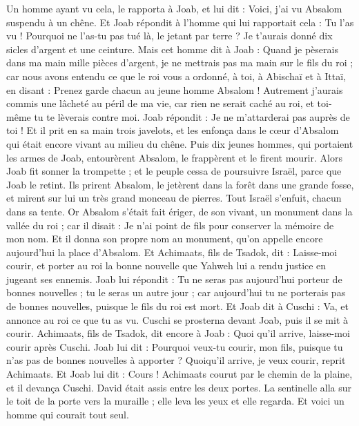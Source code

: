 \begin{multicols}{2}
Un homme ayant vu cela, le rapporta à Joab, et lui dit : Voici, j'ai vu Absalom suspendu à un chêne.
Et Joab répondit à l'homme qui lui rapportait cela : Tu l'as vu ! Pourquoi ne l'as-tu pas tué là, le jetant par terre ? Je t'aurais donné dix sicles d'argent et une ceinture.
Mais cet homme dit à Joab : Quand je pèserais dans ma main mille pièces d'argent, je ne mettrais pas ma main sur le fils du roi ; car nous avons entendu ce que le roi vous a ordonné, à toi, à Abischaï et à Ittaï, en disant : Prenez garde chacun au jeune homme Absalom !
Autrement j’aurais commis une lâcheté au péril de ma vie, car rien ne serait caché au roi, et toi-même tu te lèverais contre moi.
Joab répondit : Je ne m'attarderai pas auprès de toi ! Et il prit en sa main trois javelots, et les enfonça dans le cœur d'Absalom qui était encore vivant au milieu du chêne.
Puis dix jeunes hommes, qui portaient les armes de Joab, entourèrent Absalom, le frappèrent et le firent mourir.
Alors Joab fit sonner la trompette ; et le peuple cessa de poursuivre Israël, parce que Joab le retint.
Ils prirent Absalom, le jetèrent dans la forêt dans une grande fosse, et mirent sur lui un très grand monceau de pierres. Tout Israël s'enfuit, chacun dans sa tente.
Or Absalom s'était fait ériger, de son vivant, un monument dans la vallée du roi ; car il disait : Je n'ai point de fils pour conserver la mémoire de mon nom. Et il donna son propre nom au monument, qu'on appelle encore aujourd'hui la place d'Absalom.
Et Achimaats, fils de Tsadok, dit : Laisse-moi courir, et porter au roi la bonne nouvelle que Yahweh lui a rendu justice en jugeant ses ennemis.
Joab lui répondit : Tu ne seras pas aujourd'hui porteur de bonnes nouvelles ; tu le seras un autre jour ; car aujourd'hui tu ne porterais pas de bonnes nouvelles, puisque le fils du roi est mort.
Et Joab dit à Cuschi : Va, et annonce au roi ce que tu as vu. Cuschi se prosterna devant Joab, puis il se mit à courir.
Achimaats, fils de Tsadok, dit encore à Joab : Quoi qu'il arrive, laisse-moi courir après Cuschi. Joab lui dit : Pourquoi veux-tu courir, mon fils, puisque tu n'as pas de bonnes nouvelles à apporter ?
Quoiqu'il arrive, je veux courir, reprit Achimaats. Et Joab lui dit : Cours ! Achimaats courut par le chemin de la plaine, et il devança Cuschi.
David était assis entre les deux portes. La sentinelle alla sur le toit de la porte vers la muraille ; elle leva les yeux et elle regarda. Et voici un homme qui courait tout seul.

\end{multicols}
